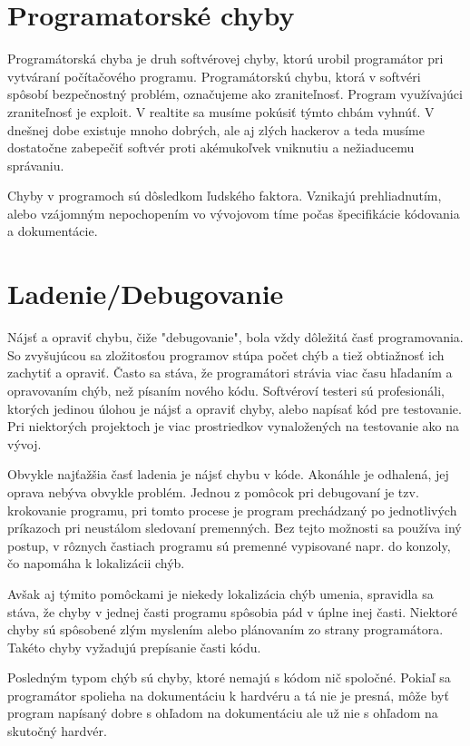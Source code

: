 \documentclass[10pt,twoside,slovak,a4paper]{article}
\begin{document}
\section{Programatorské chyby}
Programátorská chyba je druh softvérovej chyby, ktorú urobil programátor pri vytváraní počítačového programu. Programátorskú chybu, ktorá v softvéri spôsobí bezpečnostný problém, označujeme ako zraniteľnosť. Program využívajúci zraniteľnosť je exploit. V realtite sa musíme pokúsiť týmto chbám vyhnúť. V dnešnej dobe existuje mnoho dobrých, ale aj zlých hackerov a teda musíme dostatočne zabepečiť softvér proti akémukoľvek vniknutiu a nežiaducemu správaniu.

Chyby v programoch sú dôsledkom ľudského faktora. Vznikajú prehliadnutím, alebo vzájomným nepochopením vo vývojovom tíme počas špecifikácie kódovania a dokumentácie.

\section{Ladenie/Debugovanie}
Nájsť a opraviť chybu, čiže "debugovanie", bola vždy dôležitá časť programovania. So zvyšujúcou sa zložitosťou programov stúpa počet chýb a tiež obtiažnosť ich zachytiť a opraviť. Často sa stáva, že programátori strávia viac času hľadaním a opravovaním chýb, než písaním nového kódu. Softvéroví testeri sú profesionáli, ktorých jedinou úlohou je nájsť a opraviť chyby, alebo napísať kód pre testovanie. Pri niektorých projektoch je viac prostriedkov vynaložených na testovanie ako na vývoj.

Obvykle najťažšia časť ladenia je nájsť chybu v kóde. Akonáhle je odhalená, jej oprava nebýva obvykle problém. Jednou z pomôcok pri debugovaní je tzv. krokovanie programu, pri tomto procese je program prechádzaný po jednotlivých príkazoch pri neustálom sledovaní premenných. Bez tejto možnosti sa používa iný postup, v rôznych častiach programu sú premenné vypisované napr. do konzoly, čo napomáha k lokalizácii chýb.

Avšak aj týmito pomôckami je niekedy lokalizácia chýb umenia, spravidla sa stáva, že chyby v jednej časti programu spôsobia pád v úplne inej časti.
Niektoré chyby sú spôsobené zlým myslením alebo plánovaním zo strany programátora. Takéto chyby vyžadujú prepísanie časti kódu.

Posledným typom chýb sú chyby, ktoré nemajú s kódom nič spoločné. Pokiaľ sa programátor spolieha na dokumentáciu k hardvéru a tá nie je presná, môže byť program napísaný dobre s ohľadom na dokumentáciu ale už nie s ohľadom na skutočný hardvér.
\end{document}

